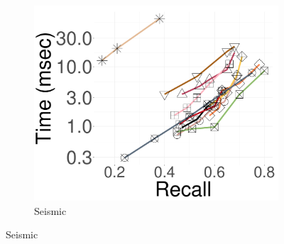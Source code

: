 \begin{figure}[!htb]
\begin{minipage}{\textwidth}
  \hspace{0.4cm}
		\begin{subfigure}{\soneM\textwidth}
  \centering
			\includegraphics[width=\textwidth]{../img/Experiments/search/25/seismic_10nn.pdf}
			\caption{Seismic}  
			\label{fig:elpis:query:performance:25GB:seismic:10NN}
		\end{subfigure}	
  

\end{minipage}
\end{figure}
